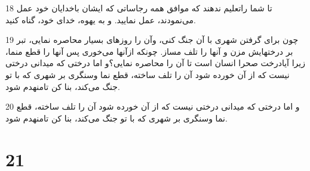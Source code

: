 \par 18 تا شما راتعلیم ندهند که موافق همه رجاساتی که ایشان باخدایان خود عمل می‌نمودند، عمل نمایید. و به یهوه، خدای خود، گناه کنید.
\par 19 چون برای گرفتن شهری با آن جنگ کنی، وآن را روزهای بسیار محاصره نمایی، تبر بر درختهایش مزن و آنها را تلف مساز. چونکه ازآنها می‌خوری پس آنها را قطع منما، زیرا آیادرخت صحرا انسان است تا آن را محاصره نمایی؟و اما درختی که میدانی درختی نیست که از آن خورده شود آن را تلف ساخته، قطع نما وسنگری بر شهری که با تو جنگ می‌کند، بنا کن تامنهدم شود.
\par 20 و اما درختی که میدانی درختی نیست که از آن خورده شود آن را تلف ساخته، قطع نما وسنگری بر شهری که با تو جنگ می‌کند، بنا کن تامنهدم شود.
 
\chapter{21}

